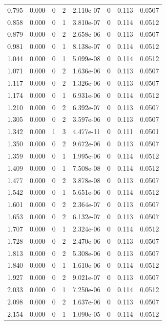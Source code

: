 \documentclass[preview]{standalone}
\begin{document}
{{\begin{tabular}{L{1.2cm}C{1.2cm} C{0.3cm}C{0.5cm} C{1.4cm}C{1.4cm} C{1.4cm}C{1.4cm}}
  0.795  &  0.000  & 0     &  2 &  2.110e-07  & 0  & 0.113 &  0.0507   \\ 
  0.858  &  0.000  & 0     &  1 &  3.810e-07  & 0  & 0.114 &  0.0512   \\ 
  0.879  &  0.000  & 0     &  2 &  2.658e-06  & 0  & 0.113 &  0.0507   \\ 
  0.981  &  0.000  & 0     &  1 &  8.138e-07  & 0  & 0.114 &  0.0512   \\ 
  1.044  &  0.000  & 0     &  1 &  5.099e-08  & 0  & 0.114 &  0.0512   \\ 
  1.071  &  0.000  & 0     &  2 &  1.636e-06  & 0  & 0.113 &  0.0507   \\ 
  1.117  &  0.000  & 0     &  2 &  1.326e-06  & 0  & 0.113 &  0.0507   \\ 
  1.174  &  0.000  & 0     &  1 &  6.931e-06  & 0  & 0.114 &  0.0512   \\ 
  1.210  &  0.000  & 0     &  2 &  6.392e-07  & 0  & 0.113 &  0.0507   \\ 
  1.305  &  0.000  & 0     &  2 &  3.597e-06  & 0  & 0.113 &  0.0507   \\ 
  1.342  &  0.000  & 1     &  3 &  4.477e-11  & 0  & 0.111 &  0.0501   \\ 
  1.350  &  0.000  & 0     &  2 &  9.672e-06  & 0  & 0.113 &  0.0507   \\ 
  1.359  &  0.000  & 0     &  1 &  1.995e-06  & 0  & 0.114 &  0.0512   \\ 
  1.409  &  0.000  & 0     &  1 &  7.508e-08  & 0  & 0.114 &  0.0512   \\ 
  1.477  &  0.000  & 0     &  2 &  3.878e-08  & 0  & 0.113 &  0.0507   \\ 
  1.542  &  0.000  & 0     &  1 &  5.651e-06  & 0  & 0.114 &  0.0512   \\ 
  1.601  &  0.000  & 0     &  2 &  2.364e-07  & 0  & 0.113 &  0.0507   \\ 
  1.653  &  0.000  & 0     &  2 &  6.132e-07  & 0  & 0.113 &  0.0507   \\ 
  1.707  &  0.000  & 0     &  1 &  2.324e-06  & 0  & 0.114 &  0.0512   \\ 
  1.728  &  0.000  & 0     &  2 &  2.470e-06  & 0  & 0.113 &  0.0507   \\ 
  1.813  &  0.000  & 0     &  2 &  5.308e-06  & 0  & 0.113 &  0.0507   \\ 
  1.840  &  0.000  & 0     &  1 &  1.610e-06  & 0  & 0.114 &  0.0512   \\ 
  1.927  &  0.000  & 0     &  2 &  9.021e-07  & 0  & 0.113 &  0.0507   \\ 
  2.033  &  0.000  & 0     &  1 &  7.250e-06  & 0  & 0.114 &  0.0512   \\ 
  2.098  &  0.000  & 0     &  2 &  1.637e-06  & 0  & 0.113 &  0.0507   \\ 
  2.154  &  0.000  & 0     &  1 &  1.090e-05  & 0  & 0.114 &  0.0512   \\ 
\hline 
\end{tabular} 

}}
\end{document}
